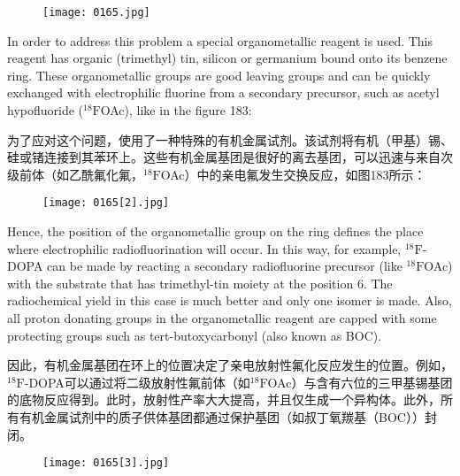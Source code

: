 \documentclass[dvipsnames, svgnames,a4paper,11pt]{article}
\begin{document}
\begin{figure}[h]
	\centering
    \texttt{[image: 0165.jpg]}    
     \label{fig182}
\end{figure}

In order to address this problem a special organometallic reagent is used. This
reagent has organic (trimethyl) tin, silicon or germanium bound onto its benzene ring.
These organometallic groups are good leaving groups and can be quickly
exchanged with electrophilic fluorine from a secondary precursor, such as acetyl
hypofluoride (${}^\mathrm{18}\mathrm{F}$OAc), like in the figure 183:

为了应对这个问题，使用了一种特殊的有机金属试剂。该试剂将有机（甲基）锡、硅或锗连接到其苯环上。这些有机金属基团是很好的离去基团，可以迅速与来自次级前体（如乙酰氟化氟，${}^\mathrm{18}\mathrm{F}$OAc）中的亲电氟发生交换反应，如图183所示：

\begin{figure}[h]
	\centering
    \texttt{[image: 0165[2].jpg]}    
     \label{fig183}
\end{figure}


Hence, the position of the organometallic group on the ring defines the place where
electrophilic radiofluorination will occur. In this way, for example, ${}^\mathrm{18}\mathrm{F}$-DOPA can be
made by reacting a secondary radiofluorine precursor (like ${}^\mathrm{18}\mathrm{F}$OAc) with the
substrate that has trimethyl-tin moiety at the position 6. The radiochemical yield in
this case is much better and only one isomer is made. Also, all proton donating
groups in the organometallic reagent are capped with some protecting groups such
as tert-butoxycarbonyl (also known as BOC).

因此，有机金属基团在环上的位置决定了亲电放射性氟化反应发生的位置。例如，${}^\mathrm{18}\mathrm{F}$-DOPA可以通过将二级放射性氟前体（如${}^\mathrm{18}\mathrm{F}$OAc）与含有六位的三甲基锡基团的底物反应得到。此时，放射性产率大大提高，并且仅生成一个异构体。此外，所有有机金属试剂中的质子供体基团都通过保护基团（如叔丁氧羰基（BOC））封闭。
\begin{figure}[h]
	\centering
    \texttt{[image: 0165[3].jpg]}    
     \label{fig184}
\end{figure}
\end{document}
